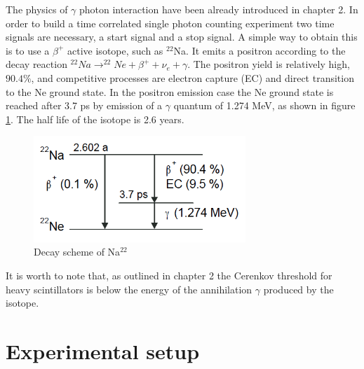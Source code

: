 The physics of $\gamma$ photon interaction have been already introduced in chapter 2.
In order to build a time correlated single photon counting experiment two time signals are necessary, a start signal and a stop signal.
A simple way to obtain this is to use a $\beta ^{+}$ active isotope, such as $^{22}$Na. 
It emits a positron according to the decay reaction $^{22}Na \rightarrow ^{22}Ne + \beta ^{+} + \nu _{e} + \gamma$. The positron yield is relatively high, $90.4\%$, and competitive processes are electron capture (EC) and direct transition to the Ne ground state. 
In the positron emission case the Ne ground state is reached after 3.7 ps by emission of a $\gamma$ quantum of 1.274 MeV, as shown in figure \ref{fig:Na_22}. The half life of the isotope is 2.6 years.
\begin{figure}[htbp]
\begin{center}
\includegraphics[width=8cm]{../Pictures/Chapter_8/Na-22}
\end{center}
\caption[Na$^{22}$ decay scheme]{Decay scheme of Na$^{22}$}
\label{fig:Na_22}
\end{figure}
It is worth to note that, as outlined in chapter 2 the Cerenkov threshold for heavy scintillators is below the energy of the annihilation $\gamma$ produced by the isotope.

\section{Experimental setup}

